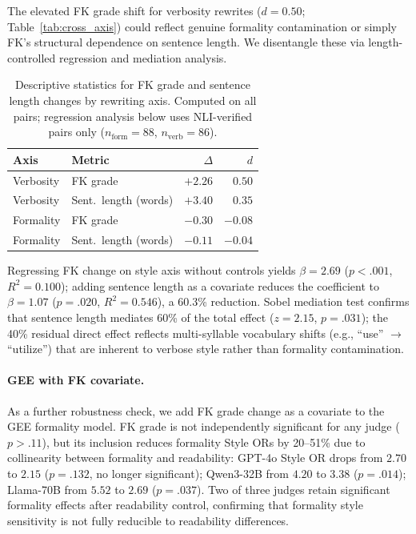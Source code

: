 The elevated FK grade shift for verbosity rewrites ($d = 0.50$; Table~\ref{tab:cross_axis}) could reflect genuine formality contamination or simply FK's structural dependence on sentence length.
We disentangle these via length-controlled regression and mediation analysis.

\begin{table}[h]
\centering
\small
\caption{Descriptive statistics for FK grade and sentence length changes by rewriting axis. Computed on all pairs; regression analysis below uses NLI-verified pairs only ($n_{\text{form}} = 88$, $n_{\text{verb}} = 86$).}
\label{tab:fk_desc}
\begin{tabular}{@{}llrr@{}}
\toprule
Axis & Metric & $\Delta$ & $d$ \\
\midrule
Verbosity & FK grade & $+2.26$ & $0.50$ \\
Verbosity & Sent.\ length (words) & $+3.40$ & $0.35$ \\
Formality & FK grade & $-0.30$ & $-0.08$ \\
Formality & Sent.\ length (words) & $-0.11$ & $-0.04$ \\
\bottomrule
\end{tabular}
\end{table}

Regressing FK change on style axis without controls yields $\beta = 2.69$ ($p < .001$, $R^2 = 0.100$); adding sentence length as a covariate reduces the coefficient to $\beta = 1.07$ ($p = .020$, $R^2 = 0.546$), a 60.3\% reduction.
Sobel mediation test confirms that sentence length mediates 60\% of the total effect ($z = 2.15$, $p = .031$); the 40\% residual direct effect reflects multi-syllable vocabulary shifts (e.g., ``use'' $\to$ ``utilize'') that are inherent to verbose style rather than formality contamination.

\paragraph{GEE with FK covariate.}
As a further robustness check, we add FK grade change as a covariate to the GEE formality model.
FK grade is not independently significant for any judge ($p > .11$), but its inclusion reduces formality Style ORs by 20--51\% due to collinearity between formality and readability: GPT-4o Style OR drops from $2.70$ to $2.15$ ($p = .132$, no longer significant); Qwen3-32B from $4.20$ to $3.38$ ($p = .014$); Llama-70B from $5.52$ to $2.69$ ($p = .037$).
Two of three judges retain significant formality effects after readability control, confirming that formality style sensitivity is not fully reducible to readability differences.

